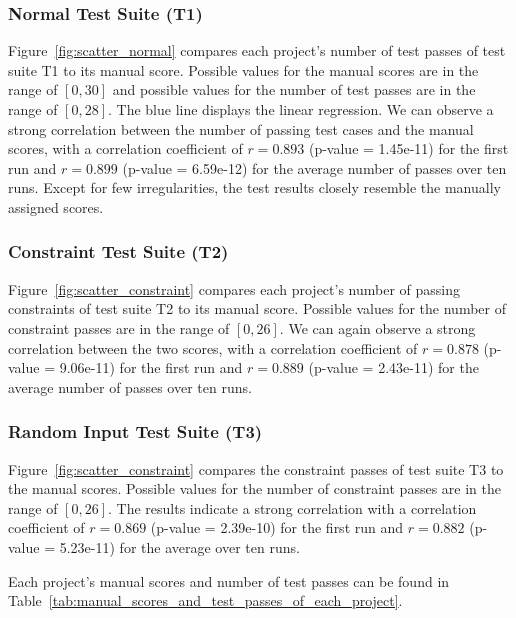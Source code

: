 \subsubsection{Normal Test Suite (T1)}

Figure~\ref{fig:scatter_normal} compares each project's number of test passes of test suite T1 to its manual score.
Possible values for the manual scores are in the range of $[0, 30]$ and possible values for the number of test passes are in the range of $[0, 28]$.
The blue line displays the linear regression.
We can observe a strong correlation between the number of passing test cases and the manual scores,
with a correlation coefficient of $r = 0.893$ (p-value = 1.45e-11) for the first run and $r = 0.899$ (p-value = 6.59e-12) for the average number of passes over ten runs.
Except for few irregularities, the test results closely resemble the manually assigned scores.

\subsubsection{Constraint Test Suite (T2)}

Figure~\ref{fig:scatter_constraint} compares each project's number of passing constraints of test suite T2 to its manual score.
Possible values for the number of constraint passes are in the range of $[0, 26]$.
We can again observe a strong correlation between the two scores,
with a correlation coefficient of $r = 0.878$ (p-value = 9.06e-11) for the first run and $r = 0.889$ (p-value = 2.43e-11) for the average number of passes over ten runs.

\subsubsection{Random Input Test Suite (T3)}

Figure~\ref{fig:scatter_constraint} compares the constraint passes of test suite T3 to the manual scores.
Possible values for the number of constraint passes are in the range of $[0, 26]$.
The results indicate a strong correlation with a correlation coefficient of $r = 0.869$ (p-value = 2.39e-10) for the first run and $r = 0.882$ (p-value = 5.23e-11) for the average over ten runs.
\parspace

\noindent Each project's manual scores and number of test passes can be found in Table~\ref{tab:manual_scores_and_test_passes_of_each_project}.


